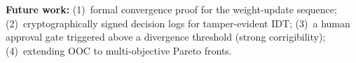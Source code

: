 \documentclass[letterpaper]{article}
\begin{document}
\textbf{Future work:}
(1)~formal convergence proof for the weight-update sequence;
(2)~cryptographically signed decision logs for tamper-evident IDT;
(3)~a human approval gate triggered above a divergence threshold
(strong corrigibility);
(4)~extending OOC to multi-objective Pareto fronts.



\end{document}

